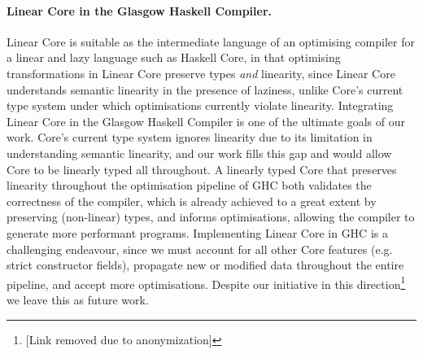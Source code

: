 \documentclass[acmsmall,review,anonymous,screen]{acmart}
\begin{document}

\paragraph{Linear Core in the Glasgow Haskell Compiler.}
Linear Core is suitable as the intermediate language of an optimising compiler
for a linear and lazy language such as Haskell Core, in that optimising
transformations in Linear Core preserve types \emph{and} linearity, since Linear
Core understands semantic linearity in the presence of laziness, unlike
Core's current type system under which optimisations currently violate
linearity.
%
Integrating Linear Core in the Glasgow Haskell Compiler is one of the ultimate
goals of our work. Core's current type system ignores linearity due to
its limitation in understanding semantic linearity, and our work fills this gap
and would allow Core to be linearly typed all throughout.
%
A linearly typed Core that preserves linearity throughout the optimisation
pipeline of GHC both validates the correctness of the compiler, which is
already achieved to a great extent by preserving (non-linear) types, and
informs optimisations, allowing the compiler to generate more performant programs.
%
Implementing Linear Core in GHC is a challenging endeavour, since we must
account for all other Core features (e.g. strict constructor fields), propagate
new or modified data throughout the entire pipeline, and accept more
optimisations. Despite our initiative in this direction\footnote{[Link removed
due to
anonymization]}%
we leave this as future work.
\end{document}
